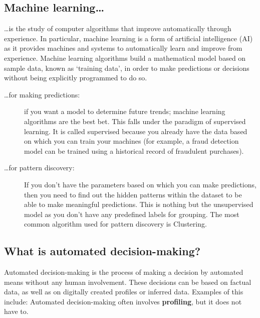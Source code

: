 \subsection{Machine learning\dots}
\dots  is the study of computer algorithms that improve automatically through experience. In particular,  machine learning is a form of artificial intelligence (AI) as it provides machines and systems to automatically learn and improve from experience. Machine learning algorithms build a mathematical model based on sample data, known as `training data', in order to make predictions or decisions without being explicitly programmed to do so.
\begin{description}
	\item[\dots  for making predictions:] if you want a model to determine future
	trends; machine learning algorithms are the best bet. This falls under the paradigm of
	supervised learning. It is called supervised because you already have the data based on
	which you can train your machines (for example, a fraud detection model can be
	trained using a historical record of fraudulent purchases).\\
	
	\item[\dots for pattern discovery:] If you don’t have the parameters based on which you can make
	predictions, then you need to find out the hidden patterns within the dataset to be
	able to make meaningful predictions. This is nothing but the unsupervised model as
	you don’t have any predefined labels for grouping. The most common algorithm used
	for pattern discovery is Clustering.
\end{description}



\subsection{What is automated decision-making?}
Automated decision-making is the process of making a decision by automated means without any human involvement. These decisions can be based on factual data, as well as on digitally created profiles or inferred data. Examples of this include:	
Automated decision-making often involves \textbf{profiling}, but it does not have to.

